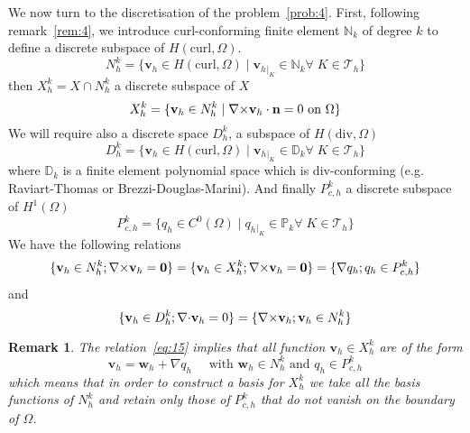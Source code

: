 \documentclass{article}
\newtheorem{remark}{Remark}
\newcommand{\ST}{\ensuremath{\; | \;}\xspace}
\newcommand{\Hdiv}{\ensuremath{H(\mathrm{div},\Omega)}\xspace}
\newcommand{\Hcurl}{\ensuremath{H(\mathrm{curl},\Omega)}\xspace}
\newcommand{\Pkch}{\ensuremath{P^k_{c,h}}\xspace}
\newcommand{\Hp}[1][1]{\ensuremath{H^{#1}(\Omega)}\xspace}
\begin{document}
We now turn to the discretisation of the problem~\ref{prob:4}. First, following
remark~\ref{rem:4}, we introduce curl-conforming finite element $\mathbb{N}_k$
of degree $k$ to define a discrete subspace of $\Hcurl$.
\begin{equation}
  \label{eq:10}
  N^k_h = \{ \mathbf{v}_h \in \Hcurl \ST \mathbf{v}_h{}_{|_K} \in \mathbb{N}_k \forall\; K
  \in \mathcal{T}_h\}
\end{equation}
then $X^k_h = X \cap N^k_h$ a discrete subspace of $X$
\begin{equation}
  \label{eq:11}
  X^k_h = \{ \mathbf{v}_h \in N^k_h \ST \curl \mathbf{v}_h \cdot \mathbf{n} = 0  \mbox{ on } \Omega \}
\end{equation}
We will require also a discrete space $D^k_h$, a subspace of $\Hdiv$
\begin{equation}
  \label{eq:14}
  D^k_h = \{ \mathbf{v}_h \in \Hcurl \ST \mathbf{v}_h{}_{|_K} \in \mathbb{D}_k \forall\; K
  \in \mathcal{T}_h\}
\end{equation}
where $\mathbb{D}_k$ is a finite element polynomial space which is
div-conforming (e.g. Raviart-Thomas or Brezzi-Douglas-Marini).
And finally $\Pkch$ a discrete subspace of $\Hp$
\begin{equation}
  \label{eq:12}
  \Pkch = \{ q_h \in C^0(\Omega) \ST q_h{}_{|_K} \in \mathbb{P}_k \forall\; K \in \mathcal{T}_h\}
\end{equation}
We have the following relations
\begin{equation}
  \label{eq:13}
  \{\mathbf{v}_h \in N^k_h; \curl \mathbf{v}_h = \mathbf{0} \} = \{\mathbf{v}_h
  \in X^k_h; \curl \mathbf{v}_h = \mathbf{0} \} = \{\nabla q_h; q_h \in \Pkch\}
\end{equation}
and
\begin{equation}
  \label{eq:15}
  \{\mathbf{v}_h \in D^k_h; {\nabla\cdot} \mathbf{v}_h = 0 \} = \{{\nabla\times} \mathbf{v}_h;
  \mathbf{v}_h \in N^k_h \}
\end{equation}
\begin{remark}
  \label{rem:5}
  The relation~\eqref{eq:15} implies that all function $\mathbf{v}_h \in X^k_h$
  are of the form
  \begin{equation}
    \label{eq:16}
    \mathbf{v}_h = \mathbf{w}_h + \nabla q_h\quad \mbox{ with } \mathbf{w}_h \in
    N^k_h \mbox{ and } q_h \in \Pkch
  \end{equation}
  which means that in order to construct a basis for $X^k_h$ we take all the
  basis functions of $N^k_h$ and retain only those of $\Pkch$ that do not vanish
  on the boundary of $\Omega$.
\end{remark}
\end{document}
